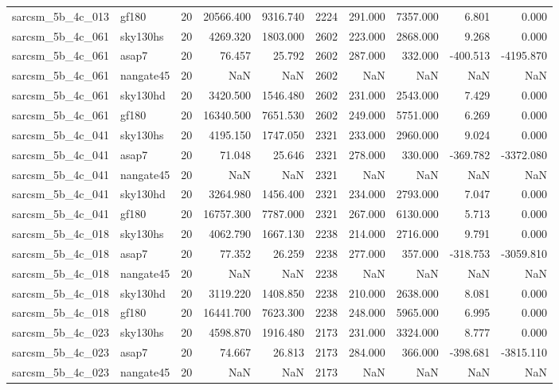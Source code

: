\begin{longtable}{llrrrrrrrr}
sarcsm\_5b\_4c\_013 & gf180 & 20 & 20566.400 & 9316.740 & 2224 & 291.000 & 7357.000 & 6.801 & 0.000 \\
sarcsm\_5b\_4c\_061 & sky130hs & 20 & 4269.320 & 1803.000 & 2602 & 223.000 & 2868.000 & 9.268 & 0.000 \\
sarcsm\_5b\_4c\_061 & asap7 & 20 & 76.457 & 25.792 & 2602 & 287.000 & 332.000 & -400.513 & -4195.870 \\
sarcsm\_5b\_4c\_061 & nangate45 & 20 & NaN & NaN & 2602 & NaN & NaN & NaN & NaN \\
sarcsm\_5b\_4c\_061 & sky130hd & 20 & 3420.500 & 1546.480 & 2602 & 231.000 & 2543.000 & 7.429 & 0.000 \\
sarcsm\_5b\_4c\_061 & gf180 & 20 & 16340.500 & 7651.530 & 2602 & 249.000 & 5751.000 & 6.269 & 0.000 \\
sarcsm\_5b\_4c\_041 & sky130hs & 20 & 4195.150 & 1747.050 & 2321 & 233.000 & 2960.000 & 9.024 & 0.000 \\
sarcsm\_5b\_4c\_041 & asap7 & 20 & 71.048 & 25.646 & 2321 & 278.000 & 330.000 & -369.782 & -3372.080 \\
sarcsm\_5b\_4c\_041 & nangate45 & 20 & NaN & NaN & 2321 & NaN & NaN & NaN & NaN \\
sarcsm\_5b\_4c\_041 & sky130hd & 20 & 3264.980 & 1456.400 & 2321 & 234.000 & 2793.000 & 7.047 & 0.000 \\
sarcsm\_5b\_4c\_041 & gf180 & 20 & 16757.300 & 7787.000 & 2321 & 267.000 & 6130.000 & 5.713 & 0.000 \\
sarcsm\_5b\_4c\_018 & sky130hs & 20 & 4062.790 & 1667.130 & 2238 & 214.000 & 2716.000 & 9.791 & 0.000 \\
sarcsm\_5b\_4c\_018 & asap7 & 20 & 77.352 & 26.259 & 2238 & 277.000 & 357.000 & -318.753 & -3059.810 \\
sarcsm\_5b\_4c\_018 & nangate45 & 20 & NaN & NaN & 2238 & NaN & NaN & NaN & NaN \\
sarcsm\_5b\_4c\_018 & sky130hd & 20 & 3119.220 & 1408.850 & 2238 & 210.000 & 2638.000 & 8.081 & 0.000 \\
sarcsm\_5b\_4c\_018 & gf180 & 20 & 16441.700 & 7623.300 & 2238 & 248.000 & 5965.000 & 6.995 & 0.000 \\
sarcsm\_5b\_4c\_023 & sky130hs & 20 & 4598.870 & 1916.480 & 2173 & 231.000 & 3324.000 & 8.777 & 0.000 \\
sarcsm\_5b\_4c\_023 & asap7 & 20 & 74.667 & 26.813 & 2173 & 284.000 & 366.000 & -398.681 & -3815.110 \\
sarcsm\_5b\_4c\_023 & nangate45 & 20 & NaN & NaN & 2173 & NaN & NaN & NaN & NaN \\

\end{longtable}
